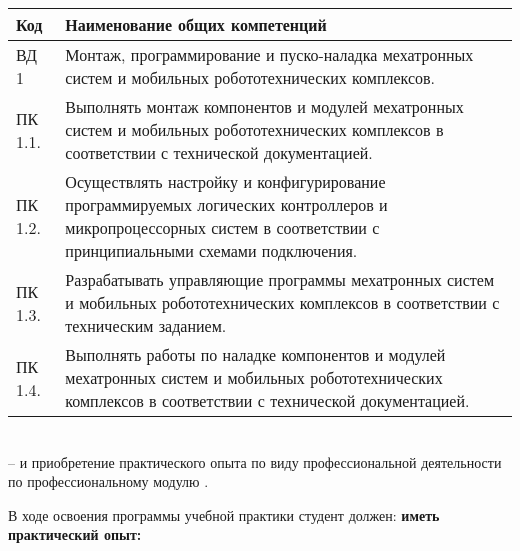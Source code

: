 \begin{tabular}{|l|m{125mm}|}
    \hline
    \textbf{Код} & \textbf{Наименование общих компетенций}\\

    \hline
    ВД 1 & Монтаж, программирование и пуско-наладка мехатронных систем и мобильных робототехнических комплексов.\\

    \hline
    ПК 1.1. & Выполнять монтаж компонентов и модулей мехатронных систем и мобильных робототехнических комплексов в соответствии с технической документацией.\\

    \hline
    ПК 1.2. & Осуществлять настройку и конфигурирование программируемых логических контроллеров и микропроцессорных систем в соответствии с принципиальными схемами подключения.\\

    \hline
    ПК 1.3. & Разрабатывать управляющие программы мехатронных систем и мобильных робототехнических комплексов в соответствии с техническим заданием.\\

    \hline
    ПК 1.4. & Выполнять работы по наладке компонентов и модулей мехатронных систем и мобильных робототехнических комплексов в соответствии с технической документацией.\\

    \hline
\end{tabular}
\\


-- и приобретение практического опыта по виду профессиональной
деятельности по профессиональному модулю \module .

\clearpage
В ходе освоения программы учебной практики студент должен: \textbf{иметь практический опыт:}
\\


